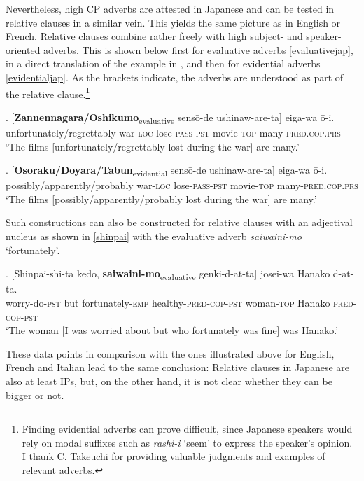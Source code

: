 \documentclass [output=book,colorlinks,citecolor=brown]{langscibook}
\begin{document}
Nevertheless, high CP adverbs are attested in Japanese and can be tested in relative clauses in a similar vein. This yields the same picture as in English or French. Relative clauses combine rather freely with high subject- and speaker-oriented adverbs. This is shown below first for evaluative adverbs \ref{evaluativejap}, in a direct translation of the example in \citet[214]{cinque:2020:relcl}, and then for evidential adverbs \ref{evidentialjap}. As the brackets indicate, the adverbs are understood as part of the relative clause.\footnote{Finding evidential adverbs can prove difficult, since Japanese speakers would rely on modal suffixes such as \textit{rashi-i} `seem' to express the speaker's opinion. I thank C. Takeuchi for providing valuable judgments and examples of relevant adverbs.} %

\exg. [\textbf{Zannennagara/Oshikumo}\textsubscript{evaluative} sensō-de ushinaw-are-ta] eiga-wa ō-i.\\
unfortunately/regrettably war-\textsc{loc} lose-\textsc{pass-pst} movie-\textsc{top} many-\textsc{pred.cop.prs}\\
`The films [unfortunately/regrettably lost during the war] are many.’ \label{evaluativejap}

\exg. [\textbf{Osoraku/Dōyara/Tabun}\textsubscript{evidential} sensō-de ushinaw-are-ta] eiga-wa ō-i.\\
possibly/apparently/probably war-\textsc{loc} lose-\textsc{pass-pst} movie-\textsc{top} many-\textsc{pred.cop.prs}\\
`The films [possibly/apparently/probably lost during the war] are many.’ \label{evidentialjap}

Such constructions can also be constructed for relative clauses with an adjectival nucleus as shown in \ref{shinpai} with the evaluative adverb \textit{saiwaini-mo} `fortunately’.

\exg. [Shinpai-shi-ta kedo, \textbf{saiwaini-mo}\textsubscript{evaluative} genki-d-at-ta] josei-wa Hanako d-at-ta.\\
worry-do-\textsc{pst} but fortunately-\textsc{emp} healthy-\textsc{pred-cop-pst} woman-\textsc{top} Hanako \textsc{pred-cop-pst}\\
`The woman [I was worried about but who fortunately was fine] was Hanako.’ \label{shinpai}

These data points in comparison with the ones illustrated above for English, French and Italian lead to the same conclusion: Relative clauses in Japanese are also at least IPs, but, on the other hand, it is not clear whether they can be bigger or not. %
\end{document}
